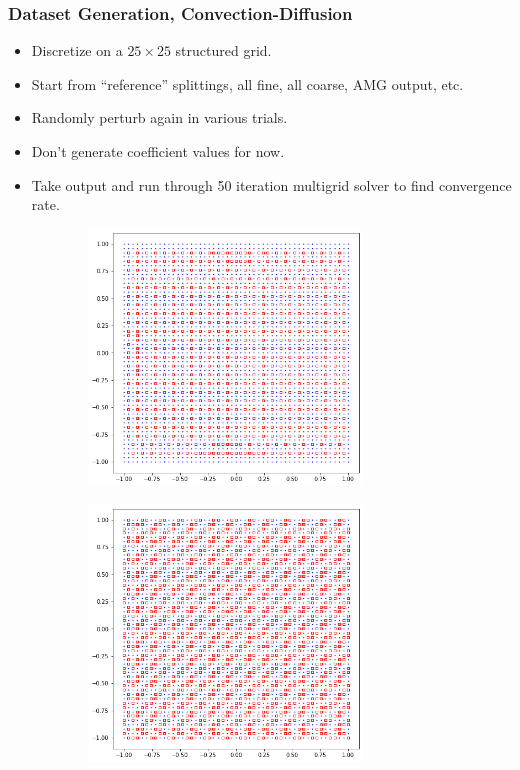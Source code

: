 \documentclass[handout]{beamer}
\begin{document}
\begin{frame}
  \frametitle{Dataset Generation, Convection-Diffusion}
  \begin{itemize}
  \item Discretize on a $25 \times 25$ structured grid.
  \item Start from ``reference'' splittings, all fine, all coarse, AMG output, etc.
  \item Randomly perturb again in various trials.
  \item Don't generate coefficient values for now.
  \item Take output and run through 50 iteration multigrid solver to find convergence rate.
  \end{itemize}
  \begin{figure}[h]
  \begin{subfigure}{.48\textwidth}
    \includegraphics[width=0.8\textwidth]{figures/amgsplit.png}
  \end{subfigure}
  \begin{subfigure}{.48\textwidth}
    \includegraphics[width=0.8\textwidth]{figures/lin_split.png}
  \end{subfigure}
  \end{figure}
\end{frame}
\end{document}
